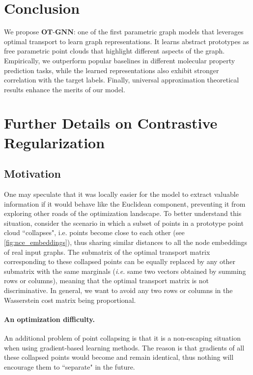 \documentclass[letterpaper]{article} \usepackage{aaai22}  \usepackage{times}  \usepackage{helvet}  \usepackage{courier}  \usepackage[hyphens]{url}  \usepackage{graphicx} \urlstyle{rm} \def\UrlFont{\rm}  \usepackage{natbib}  \usepackage{caption} \DeclareCaptionStyle{ruled}{labelfont=normalfont,labelsep=colon,strut=off} \frenchspacing  \setlength{\pdfpagewidth}{8.5in}  \setlength{\pdfpageheight}{11in}  \usepackage{algorithm}
\begin{document}
\section{Conclusion}
We propose $\mathbf{OT\text{-}GNN}$: one of the first parametric graph models that leverages optimal transport to learn graph representations. It learns abstract prototypes as free parametric point clouds that highlight different aspects of the graph. Empirically, we outperform popular baselines in different molecular property prediction tasks, while the learned representations also exhibit stronger correlation with the target labels. Finally, universal approximation theoretical results enhance the merits of our model.

\appendix

\clearpage

\section{Further Details on Contrastive Regularization}
\subsection{Motivation}\label{sec:discussion-nce}

One may speculate that it was locally easier for the model to extract valuable information if it would behave like the Euclidean component, preventing it from exploring other roads of the optimization landscape. To better understand this situation, consider the scenario in which a subset of points in a prototype point cloud ``collapses", i.e. points become close to each other (see \cref{fig:nce_embeddings}), thus sharing similar distances to all the node embeddings of real input graphs. The submatrix of the optimal transport matrix corresponding to these collapsed points can be equally replaced by any other submatrix with the same marginals (\textit{i.e.} same two vectors obtained by summing rows or columns), meaning that the optimal transport matrix is not discriminative. In general, we want to avoid any two rows or columns in the Wasserstein cost matrix being proportional. 

\paragraph{An optimization difficulty.} An additional problem of point collapsing is that it is a non-escaping situation when using gradient-based learning methods. The reason is that gradients of all these collapsed points would become and remain identical, thus nothing will encourage them to ``separate" in the future.
\end{document}
